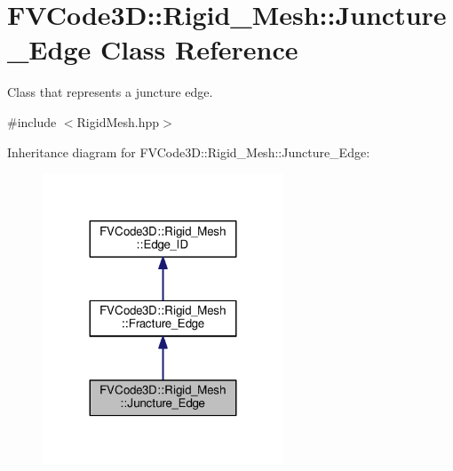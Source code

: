 \hypertarget{classFVCode3D_1_1Rigid__Mesh_1_1Juncture__Edge}{}\section{F\+V\+Code3D\+:\+:Rigid\+\_\+\+Mesh\+:\+:Juncture\+\_\+\+Edge Class Reference}
\label{classFVCode3D_1_1Rigid__Mesh_1_1Juncture__Edge}


Class that represents a juncture edge.  




{\ttfamily \#include $<$Rigid\+Mesh.\+hpp$>$}



Inheritance diagram for F\+V\+Code3D\+:\+:Rigid\+\_\+\+Mesh\+:\+:Juncture\+\_\+\+Edge\+:
\nopagebreak
\begin{figure}[H]
\begin{center}
\leavevmode
\includegraphics[width=203pt]{classFVCode3D_1_1Rigid__Mesh_1_1Juncture__Edge__inherit__graph}
\end{center}
\end{figure}


